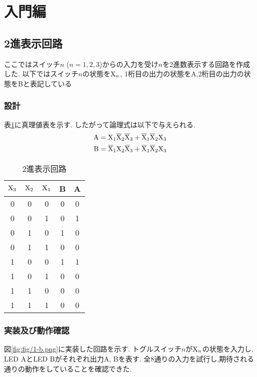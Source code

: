 \section{入門編}
\subsection{2進表示回路}
ここではスイッチ$n$ ($n=1,2,3$)からの入力を受け$n$を2進数表示する回路を作成した.
以下ではスイッチ$n$の状態を${\rm X}_n$,
1桁目の出力の状態をA,2桁目の出力の状態をBと表記している
\subsubsection{設計}
表\ref{tab:binary}に真理値表を示す.
したがって論理式は以下で与えられる.
\begin{align}
  \begin{split}
    {\rm A} &= {\rm X}_1{\rm\overline{X}}_2{\rm\overline{X}}_3+{\rm\overline{X}}_1{\rm\overline{X}}_2{\rm X}_3\\
    {\rm B} &= {\rm\overline{X}}_1{\rm X}_2{\rm\overline{X}}_3+{\rm\overline{X}}_1{\rm\overline{X}}_2{\rm X}_3
  \end{split}
\end{align}
\begin{table}[h]
  \label{tab:binary}
  \centering
  \begin{tabular}{ccc|cc}
    \hline
    ${\rm X}_3$ & ${\rm X}_2$ & ${\rm X}_1$ & B & A\\
    \hline
    0 & 0 & 0 & 0 & 0 \\
    0 & 0 & 1 & 0 & 1 \\
    0 & 1 & 0 & 1 & 0 \\
    0 & 1 & 1 & 0 & 0 \\
    1 & 0 & 0 & 1 & 1 \\
    1 & 0 & 1 & 0 & 0 \\
    1 & 1 & 0 & 0 & 0 \\
    1 & 1 & 1 & 0 & 0 \\
    \hline
  \end{tabular}
  \caption{2進表示回路}
\end{table}
\clearpage
\subsubsection{実装及び動作確認}
図\ref{fig:fig/1-b.png}に実装した回路を示す.
トグルスイッチ$n$が${\rm X}_n$の状態を入力し,
LED AとLED Bがそれぞれ出力A, Bを表す.
全8通りの入力を試行し,期待される通りの動作をしていることを確認できた.
\clearpage
